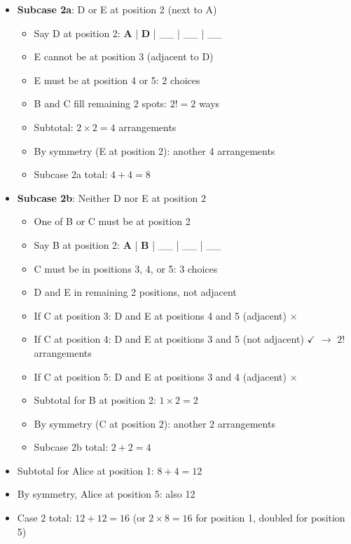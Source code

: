 \documentclass[]{article}
\begin{document}
\begin{solutionbox}
\begin{itemize}[leftmargin=*]
    \item \textbf{Subcase 2a}: D or E at position 2 (next to A)
    \begin{itemize}
        \item Say D at position 2: \textbf{A} | \textbf{D} | \_\_ | \_\_ | \_\_
        \item E cannot be at position 3 (adjacent to D)
        \item E must be at position 4 or 5: 2 choices
        \item B and C fill remaining 2 spots: $2! = 2$ ways
        \item Subtotal: $2 \times 2 = 4$ arrangements
        \item By symmetry (E at position 2): another 4 arrangements
        \item Subcase 2a total: $4 + 4 = 8$
    \end{itemize}
    
    \item \textbf{Subcase 2b}: Neither D nor E at position 2
    \begin{itemize}
        \item One of B or C must be at position 2
        \item Say B at position 2: \textbf{A} | \textbf{B} | \_\_ | \_\_ | \_\_
        \item C must be in positions 3, 4, or 5: 3 choices
        \item D and E in remaining 2 positions, not adjacent
        \item If C at position 3: D and E at positions 4 and 5 (adjacent) $\times$
        \item If C at position 4: D and E at positions 3 and 5 (not adjacent) $\checkmark$ $\rightarrow$ $2!$ arrangements
        \item If C at position 5: D and E at positions 3 and 4 (adjacent) $\times$
        \item Subtotal for B at position 2: $1 \times 2 = 2$
        \item By symmetry (C at position 2): another 2 arrangements
        \item Subcase 2b total: $2 + 2 = 4$
    \end{itemize}
    
    \item Subtotal for Alice at position 1: $8 + 4 = 12$
    \item By symmetry, Alice at position 5: also 12
    \item Case 2 total: $12 + 12 = \boxed{16}$ (or $2 \times 8 = 16$ for position 1, doubled for position 5)
\end{itemize}


\end{solutionbox}
\end{document}
